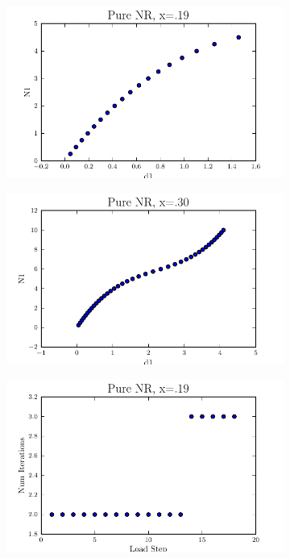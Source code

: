 \documentclass[10pt,letterpaper]{article}
\begin{document}
\begin{figure}[!tbh]
  \begin{subfigure}[b]{.6\textwidth}
    \includegraphics[width=1\textwidth]{pure_nr_x19.pdf}
    \caption{}
    \label{fig2:label:a}
  \end{subfigure}
  \hfill
  \begin{subfigure}[b]{.6\textwidth}
    \includegraphics[width=1\textwidth]{pure_nr_x30.pdf}
    \caption{}
    \label{fig2:label:b}
  \end{subfigure}
  \hfill
    \begin{subfigure}[b]{.6\textwidth}
    \includegraphics[width=1\textwidth]{pure_nr_x19_conv.pdf}

\end{subfigure}
\end{figure}
\end{document}
